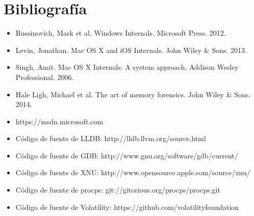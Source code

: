 \section{Bibliografía}

\begin{itemize}

\item Russinovich, Mark et al. Windows Internals. Microsoft Press. 2012.

\item Levin, Jonathan. Mac OS X and iOS Internals. John Wiley \& Sons. 2013.

\item Singh, Amit. Mac OS X Internals: A system approach. Addison Wesley
    Professional. 2006.

\item Hale Ligh, Michael et al. The art of memory forensics. John Wiley \&
    Sons.  2014.

\item https://msdn.microsoft.com

\item Código de fuente de LLDB: http://lldb.llvm.org/source.html

\item Código de fuente de GDB: http://www.gnu.org/software/gdb/current/

\item Código de fuente de XNU: http://www.opensource.apple.com/source/xnu/

\item Código de fuente de procps: git://gitorious.org/procps/procps.git

\item Código de fuente de Volatility: https://github.com/volatilityfoundation

\end{itemize}
